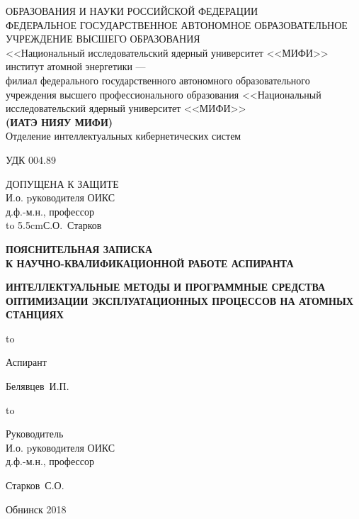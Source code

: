 \thispagestyle{empty}

\begin{center}
{ ОБРАЗОВАНИЯ И НАУКИ РОССИЙСКОЙ ФЕДЕРАЦИИ\\
ФЕДЕРАЛЬНОЕ ГОСУДАРСТВЕННОЕ АВТОНОМНОЕ ОБРАЗОВАТЕЛЬНОЕ УЧРЕЖДЕНИЕ ВЫСШЕГО ОБРАЗОВАНИЯ\\
<<Национальный исследовательский ядерный университет <<МИФИ>>\\
{ институт атомной энергетики ---}\\
филиал федерального государственного автономного образовательного\\
учреждения высшего профессионального образования <<Национальный\\
исследовательский ядерный университет <<МИФИ>>\\
{\bf(ИАТЭ НИЯУ МИФИ)}}\\ 

\vspace{2em}
Отделение интеллектуальных кибернетических систем
\end{center}
\vspace{2em}
УДК 004.89
\hfill
\parbox{5.5cm}
{
ДОПУЩЕНА К ЗАЩИТЕ\\
И.о. pуководителя ОИКС\\
д.ф.-м.н., профессор\\
\hbox to 5.5cm{\dotfill С.О.~Старков}
}
\vspace{5em}
\begin{center}
\textbf{ПОЯСНИТЕЛЬНАЯ ЗАПИСКА\\ К НАУЧНО-КВАЛИФИКАЦИОННОЙ РАБОТЕ АСПИРАНТА}
\end{center}


\begin{center}
\bf
ИНТЕЛЛЕКТУАЛЬНЫЕ МЕТОДЫ И ПРОГРАММНЫЕ СРЕДСТВА ОПТИМИЗАЦИИ ЭКСПЛУАТАЦИОННЫХ ПРОЦЕССОВ НА АТОМНЫХ СТАНЦИЯХ
\end{center}

\vspace{6em}

\hbox to \textwidth
{\parbox{6 cm}{Аспирант}\dotfill \parbox{4 cm}{
\begin{flushright}Белявцев~И.П.\end{flushright}}}
\vspace{2em}

\hbox to \textwidth
{\parbox{6 cm}{Руководитель\\ И.о. pуководителя ОИКС\\ д.ф.-м.н., профессор}\dotfill \parbox{4 cm}{
\begin{flushright}Старков~С.О.\end{flushright}}}
\vspace{2em}


\vspace{\fill}

\begin{center}
Обнинск 2018
\end{center}

\newpage